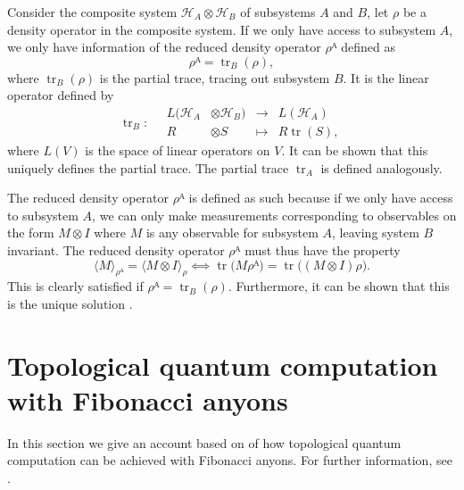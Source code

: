 Consider the composite system $\mathcal{H}_A ⊗ \mathcal{H}_B$ of subsystems $A$ and $B$, let $ρ$ be a density operator in the composite system. If we only have access to subsystem $A$, we only have information of the reduced density operator $ρᴬ$ defined as
\begin{equation}\label{eq:red dens op}
  ρᴬ = \operatorname{tr}_B(ρ),
\end{equation}
where $\operatorname{tr}_B(ρ)$ is the partial trace, tracing out subsystem $B$. It is the linear operator defined by
\begin{equation}
  \operatorname{tr}_B : \quad
  \begin{alignedat}{2}
    L(\mathcal{H}_A &⊗ \mathcal{H}_B) &{}\to{}& L(\mathcal{H}_A) \\
    R&⊗S &{}↦{}& R\operatorname{tr}(S),
  \end{alignedat}
\end{equation}
where $L(V)$ is the space of linear operators on $V$. It can be shown
that this uniquely defines the partial trace. The partial trace $\operatorname{tr}_A$ is defined analogously.

The reduced density operator $ρᴬ$ is defined as such because if we only have access to subsystem $A$, we can only make measurements corresponding to observables on the form $M⊗I$ where $M$ is any observable for subsystem $A$, leaving system $B$ invariant. The reduced density operator $ρᴬ$ must thus have the property
\begin{equation}
  ⟨M⟩_{ρᴬ} = ⟨M⊗I⟩_ρ ⟺
  \operatorname{tr}\big(Mρᴬ\big)
  = \operatorname{tr}\big((M⊗I)ρ\big).
\end{equation}
This is clearly satisfied if $ρᴬ = \operatorname{tr}_B(ρ)$. Furthermore, it can be shown that this is the unique solution \cite{nielsen chuang}.













\section{Topological quantum computation with Fibonacci anyons}\label{sec:computing with fibonacci}

In this section we give an account based on  of how topological quantum computation can be achieved with Fibonacci anyons. For further information, see \cite{topological quantum compiling,kitaev fault-tolerant anyons,kauffman lomonaco,wang book,pachos book,asymptotical top compl,slingerland bais}.

